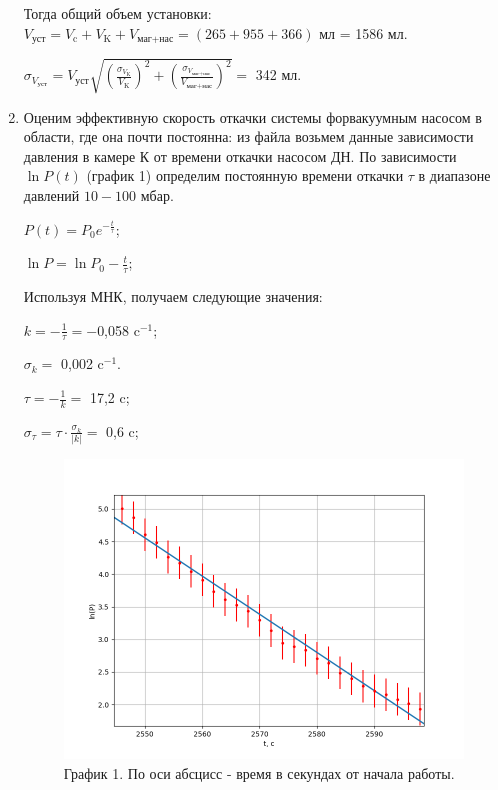 \documentclass[a4paper,12pt]{article} %
\begin{document}
\begin{enumerate}
	\begin{center}
	\end{center}
	
	Тогда общий объем установки: $V_{\text{уст}} = V_{\text{c}} + V_{\text{K}} + V_{\text{маг+нас}} = (265 + 955 + 366)$ мл = 1586 мл.
	
	$\sigma_{V_{\text{уст}}} = V_{\text{уст}}\sqrt{\left(\frac{\sigma_{V_{\text{K}}}}{V_{\text{K}}}\right)^2 + \left(\frac{\sigma_{V_{\text{маг+нас}}}}{V_{\text{маг+нас}}}\right)^2} = $ 342 мл.
	
	\begin{center}
	\end{center}
	
	\item Оценим эффективную скорость откачки системы форвакуумным насосом в области, где она почти постоянна: из файла возьмем данные зависимости давления в камере К от времени откачки насосом ДН. По зависимости $\ln{P}(t)$ (график 1) определим постоянную времени откачки $\tau$ в диапазоне давлений $10-100$ мбар.
	
	$P(t) = P_{0}e^{-\frac{t}{\tau}}$;
	
	$\ln{P} = \ln{P_{0}} - \frac{t}{\tau}$;
	
	Используя МНК, получаем следующие значения:
	
	$k = -\frac{1}{\tau} = -$0,058 c$^{-1}$;
	
	$\sigma_{k} = $ 0,002 c$^{-1}$.
	
	\vspace{5mm}
	$\tau = -\frac{1}{k} = $ 17,2 c;
	
	$\sigma_{\tau} = \tau \cdot \frac{\sigma_{k}}{|k|} = $ 0,6 c;

	\begin{center}
	\end{center}

	\begin{figure}[h!]
		\centering
		\includegraphics[scale=0.7]{Pictures/lnP(t) ДН.png}
		\caption*{График 1. По оси абсцисс - время в секундах от начала работы.}
	\end{figure}
	


\end{enumerate}
\end{document}
